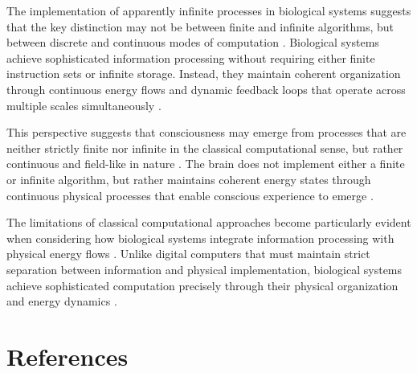 \begin{refsection}
The implementation of apparently infinite processes in biological systems suggests that the key distinction may not be between finite and infinite algorithms, but between discrete and continuous modes of computation \cite{Goldin2006}. Biological systems achieve sophisticated information processing without requiring either finite instruction sets or infinite storage. Instead, they maintain coherent organization through continuous energy flows and dynamic feedback loops that operate across multiple scales simultaneously \cite{Floyd2014}.

This perspective suggests that consciousness may emerge from processes that are neither strictly finite nor infinite in the classical computational sense, but rather continuous and field-like in nature \cite{Barendregt1984}. The brain does not implement either a finite or infinite algorithm, but rather maintains coherent energy states through continuous physical processes that enable conscious experience to emerge \cite{Boolos2007}.

The limitations of classical computational approaches become particularly evident when considering how biological systems integrate information processing with physical energy flows \cite{Kozen2006}. Unlike digital computers that must maintain strict separation between information and physical implementation, biological systems achieve sophisticated computation precisely through their physical organization and energy dynamics \cite{Mancosu2008}.

\newpage
\section{References}
\printbibliography[title={},heading=subbibliography]
\end{refsection}